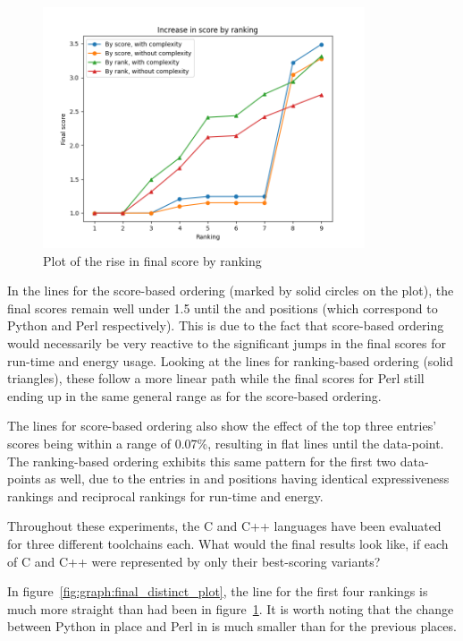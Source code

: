 \begin{figure}[h]
	\centering
	\includegraphics[width=0.85\textwidth]{figures/final_scores_plot.png}
	\caption{Plot of the rise in final score by ranking}
	\label{fig:graph:final_scores_plot}
\end{figure}

In the lines for the score-based ordering (marked by solid circles on the plot), the final scores remain well under 1.5 until the  and  positions (which correspond to Python and Perl respectively). This is due to the fact that score-based ordering would necessarily be very reactive to the significant jumps in the final scores for run-time and energy usage. Looking at the lines for ranking-based ordering (solid triangles), these follow a more linear path while the final scores for Perl still ending up in the same general range as for the score-based ordering.

The lines for score-based ordering also show the effect of the top three entries' scores being within a range of 0.07\%, resulting in flat lines until the  data-point. The ranking-based ordering exhibits this same pattern for the first two data-points as well, due to the entries in  and  positions having identical expressiveness rankings and reciprocal rankings for run-time and energy.

Throughout these experiments, the C and C++ languages have been evaluated for three different toolchains each. What would the final results look like, if each of C and C++ were represented by only their best-scoring variants?

In figure~\ref{fig:graph:final_distinct_plot}, the line for the first four rankings is much more straight than had been in figure~\ref{fig:graph:final_scores_plot}. It is worth noting that the change between Python in  place and Perl in  is much smaller than for the previous places.

